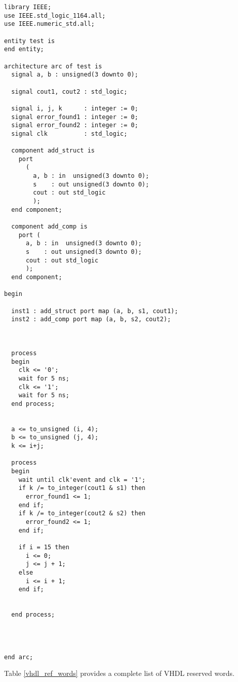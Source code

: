 \documentclass[12pt]{tdtp}
\begin{document}
\begin{lstlisting}
library IEEE;
use IEEE.std_logic_1164.all;
use IEEE.numeric_std.all;

entity test is
end entity;

architecture arc of test is
  signal a, b : unsigned(3 downto 0);

  signal cout1, cout2 : std_logic;

  signal i, j, k      : integer := 0; 
  signal error_found1 : integer := 0;  
  signal error_found2 : integer := 0;   
  signal clk          : std_logic;  

  component add_struct is
    port
      (
        a, b : in  unsigned(3 downto 0);
        s    : out unsigned(3 downto 0);
        cout : out std_logic
        );
  end component;

  component add_comp is
    port (
      a, b : in  unsigned(3 downto 0);
      s    : out unsigned(3 downto 0);
      cout : out std_logic
      );
  end component;

begin

  inst1 : add_struct port map (a, b, s1, cout1);
  inst2 : add_comp port map (a, b, s2, cout2);



  process
  begin
    clk <= '0';
    wait for 5 ns;
    clk <= '1';
    wait for 5 ns;
  end process;


  a <= to_unsigned (i, 4);
  b <= to_unsigned (j, 4);
  k <= i+j;

  process
  begin
    wait until clk'event and clk = '1';
    if k /= to_integer(cout1 & s1) then
      error_found1 <= 1;
    end if;
    if k /= to_integer(cout2 & s2) then
      error_found2 <= 1;
    end if;

    if i = 15 then
      i <= 0;
      j <= j + 1;
    else
      i <= i + 1;
    end if;

    
  end process;




end arc;
\end{lstlisting}

Table \ref{vhdl_ref_words} provides a complete list of VHDL reserved words.
\end{document}
